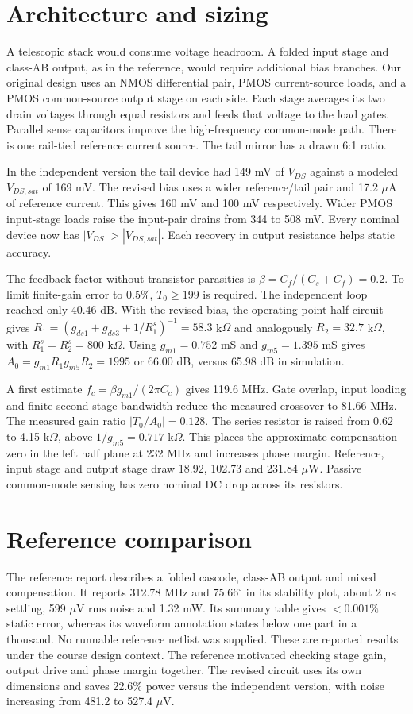 \documentclass[10pt,journal]{IEEEtran}
\begin{document}
\section{Architecture and sizing}
A telescopic stack would consume voltage headroom. A folded input stage and class-AB output, as in the reference, would require additional bias branches. Our original design uses an NMOS differential pair, PMOS current-source loads, and a PMOS common-source output stage on each side. Each stage averages its two drain voltages through equal resistors and feeds that voltage to the load gates. Parallel sense capacitors improve the high-frequency common-mode path. There is one rail-tied reference current source. The tail mirror has a drawn 6:1 ratio.
\par In the independent version the tail device had 149 mV of $V_{DS}$ against a modeled $V_{DS,sat}$ of 169 mV. The revised bias uses a wider reference/tail pair and 17.2 $\mu$A of reference current. This gives 160 mV and 100 mV respectively. Wider PMOS input-stage loads raise the input-pair drains from 344 to 508 mV. Every nominal device now has $|V_{DS}|>|V_{DS,sat}|$. Each recovery in output resistance helps static accuracy.
\par The feedback factor without transistor parasitics is $\beta=C_f/(C_s+C_f)=0.2$. To limit finite-gain error to 0.5\%, $T_0\ge199$ is required. The independent loop reached only 40.46 dB. With the revised bias, the operating-point half-circuit gives $R_1=(g_{ds1}+g_{ds3}+1/R_1^s)^{-1}=58.3$ k$\Omega$ and analogously $R_2=32.7$ k$\Omega$, with $R_1^s=R_2^s=800$ k$\Omega$. Using $g_{m1}=0.752$ mS and $g_{m5}=1.395$ mS gives $A_0=g_{m1}R_1g_{m5}R_2=1995$ or 66.00 dB, versus 65.98 dB in simulation.
\par A first estimate $f_c=\beta g_{m1}/(2\pi C_c)$ gives 119.6 MHz. Gate overlap, input loading and finite second-stage bandwidth reduce the measured crossover to 81.66 MHz. The measured gain ratio $|T_0/A_0|=0.128$. The series resistor is raised from 0.62 to 4.15 k$\Omega$, above $1/g_{m5}=0.717$ k$\Omega$. This places the approximate compensation zero in the left half plane at 232 MHz and increases phase margin. Reference, input stage and output stage draw 18.92, 102.73 and 231.84 $\mu$W. Passive common-mode sensing has zero nominal DC drop across its resistors.
\section{Reference comparison}
The reference report describes a folded cascode, class-AB output and mixed compensation. It reports 312.78 MHz and $75.66^\circ$ in its stability plot, about 2 ns settling, 599 $\mu$V rms noise and 1.32 mW. Its summary table gives $<0.001\%$ static error, whereas its waveform annotation states below one part in a thousand. No runnable reference netlist was supplied. These are reported results under the course design context. The reference motivated checking stage gain, output drive and phase margin together. The revised circuit uses its own dimensions and saves 22.6\% power versus the independent version, with noise increasing from 481.2 to 527.4 $\mu$V.
\clearpage
\onecolumn
\end{document}
